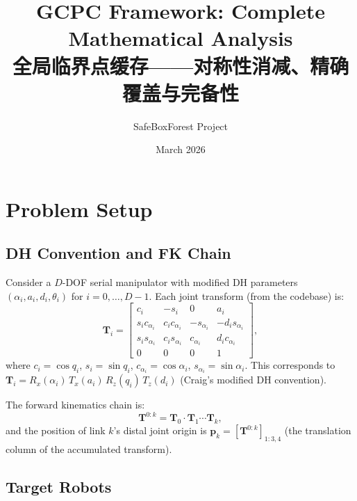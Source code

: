 \documentclass[11pt,a4paper]{article}
\title{GCPC Framework: Complete Mathematical Analysis\\
\large 全局临界点缓存——对称性消减、精确覆盖与完备性}
\author{SafeBoxForest Project}
\date{March 2026}
\newcommand{\bT}{\mathbf{T}}
\newcommand{\bp}{\mathbf{p}}
\begin{document}
\maketitle
\tableofcontents
\newpage

\section{Problem Setup}\label{sec:setup}

\subsection{DH Convention and FK Chain}

Consider a $D$-DOF serial manipulator with modified DH parameters
$(\alpha_i, a_i, d_i, \theta_i)$ for $i = 0,\ldots,D-1$.
Each joint transform (from the codebase) is:
\begin{equation}\label{eq:dh}
  \bT_i
  = \begin{bmatrix}
      c_i     & -s_i    & 0        & a_i \\
      s_i c_{\alpha_i} & c_i c_{\alpha_i} & -s_{\alpha_i} & -d_i s_{\alpha_i} \\
      s_i s_{\alpha_i} & c_i s_{\alpha_i} &  c_{\alpha_i} &  d_i c_{\alpha_i} \\
      0        & 0       & 0        & 1
    \end{bmatrix},
\end{equation}
where $c_i = \cos q_i$, $s_i = \sin q_i$,
$c_{\alpha_i} = \cos\alpha_i$, $s_{\alpha_i} = \sin\alpha_i$.
This corresponds to $\bT_i = R_x(\alpha_i)\,T_x(a_i)\,R_z(q_i)\,T_z(d_i)$
(Craig's modified DH convention).

The forward kinematics chain is:
\begin{equation}\label{eq:fk_chain}
  \bT^{0:k} = \bT_0 \cdot \bT_1 \cdots \bT_k,
\end{equation}
and the position of link $k$'s distal joint origin is
$\bp_k = [\bT^{0:k}]_{1:3,4}$ (the translation column of the accumulated transform).

\subsection{Target Robots}
\end{document}
